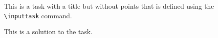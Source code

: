 This is a task with a title but without points that is defined using the \texttt{\textbackslash inputtask} command.

\begin{solution}
    This is a solution to the task.
\end{solution}
